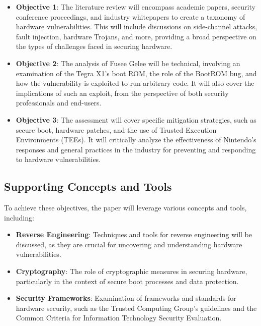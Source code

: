\begin{itemize}
\item
  \textbf{Objective 1}: The literature review will encompass academic papers, security conference proceedings, and industry whitepapers to create a taxonomy of hardware vulnerabilities. This will include discussions on side-channel attacks, fault injection, hardware Trojans, and more, providing a broad perspective on the types of challenges faced in securing hardware.
\item
  \textbf{Objective 2}: The analysis of Fusee Gelee will be technical, involving an examination of the Tegra X1's boot ROM, the role of the BootROM bug, and how the vulnerability is exploited to run arbitrary code. It will also cover the implications of such an exploit, from the perspective of both security professionals and end-users.
\item
  \textbf{Objective 3}: The assessment will cover specific mitigation strategies, such as secure boot, hardware patches, and the use of Trusted Execution Environments (TEEs). It will critically analyze the effectiveness of Nintendo's responses and general practices in the industry for preventing and responding to hardware vulnerabilities.
\end{itemize}

\hypertarget{supporting-concepts-and-tools}{%
\subsection{Supporting Concepts and
Tools}\label{supporting-concepts-and-tools}}

To achieve these objectives, the paper will leverage various concepts
and tools, including:

\begin{itemize}
\item
  \textbf{Reverse Engineering}: Techniques and tools for reverse
  engineering will be discussed, as they are crucial for uncovering and
  understanding hardware vulnerabilities.
\item
  \textbf{Cryptography}: The role of cryptographic measures in securing
  hardware, particularly in the context of secure boot processes and
  data protection.
\item
  \textbf{Security Frameworks}: Examination of frameworks and standards
  for hardware security, such as the Trusted Computing Group's
  guidelines and the Common Criteria for Information Technology Security
  Evaluation.
\end{itemize}

